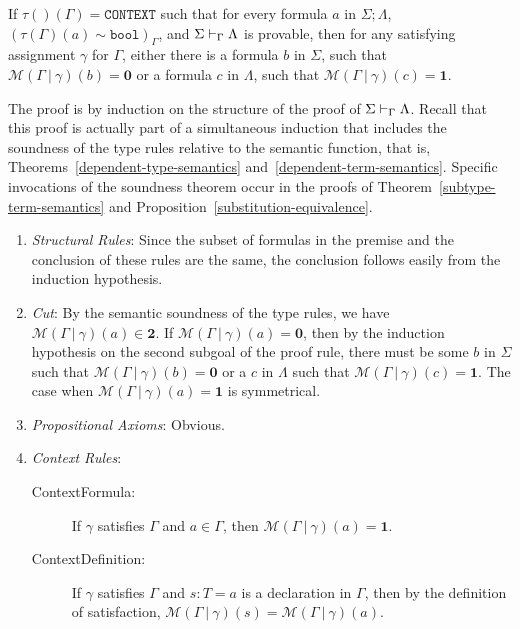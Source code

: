 \documentclass [12pt,twoside]{cslreport}
\newcommand{\thmbox}
   {{\ \hfill\hbox{%
      \vrule width1.0ex height1.0ex
   }\parfillskip 0pt }}
\newenvironment{proof}{{\bf Proof. }}{\thmbox}
\newcommand{\tauGamma}[1]{\tau(\Gamma)(#1)}
\newcommand{\Mgamma}[1]{{\mathcal M}(\Gamma\vbar\gamma)(#1)}
\newcommand{\twob}{\mathbf{2}}
\newcommand{\oneb}{\mathbf{1}}
\newcommand{\zerob}{\mathbf{0}}
\newcommand{\ttbool}{\mathtt{bool}}
\newcommand{\ttcontext}{\mathtt{CONTEXT}}
\newcommand{\vbar}{\ |\ }
\begin{document}
\begin{theorem}[soundness]\label{proof-soundness}
If $\tau()(\Gamma) = \ttcontext$ such that
for every formula $a$ in $\Sigma;  \Lambda$, $(\tauGamma{a} \sim
\ttbool)_\Gamma$,
and $\Sigma\vdash_{\Gamma}\Lambda$ is provable, then
for any satisfying assignment
$\gamma$ for $\Gamma$, 
either there is a formula $b$ in $\Sigma$, such that $\Mgamma{b} = \zerob$
or a formula $c$ in
$\Lambda$, such that $\Mgamma{c} = \oneb$\@.      
\end{theorem}
\begin{proof}
The proof is by induction on the structure of the proof of
$\Sigma\vdash_{\Gamma}\Lambda$.  Recall that this proof is actually
part of a simultaneous induction that includes the soundness of the type
rules relative to the semantic function, that is,
Theorems~\ref{dependent-type-semantics}
and~\ref{dependent-term-semantics}\@.   Specific invocations of the
soundness theorem occur in the proofs of
Theorem~\ref{subtype-term-semantics}
and Proposition~\ref{substitution-equivalence}\@.  
\begin{enumerate}
\item {\em Structural Rules\/}:   Since the subset
of formulas in the premise and the conclusion of these rules are the same,
the conclusion follows easily from the induction hypothesis.

\item {\em Cut\/}: By the semantic soundness of the type rules,
we have $\Mgamma{a} \in \twob$\@.   If $\Mgamma{a} = \zerob$, then
by the induction hypothesis on the second subgoal of the proof rule,
there must be some $b$ in $\Sigma$ such that $\Mgamma{b} = \zerob$
or a $c$ in $\Lambda$ such that $\Mgamma{c} = \oneb$\@.  The case
when $\Mgamma{a} = \oneb$ is symmetrical.

\item {\em Propositional Axioms\/}:  Obvious.

\item \emph{Context Rules}:
\begin{description}
\item[ContextFormula:]  If $\gamma$ satisfies $\Gamma$ and $a\in \Gamma$,
then $\Mgamma{a} = \oneb$\@.

\item[ContextDefinition:] If $\gamma$ satisfies $\Gamma$ and $s: T = a$
is a declaration in $\Gamma$, then by the definition of satisfaction,
$\Mgamma{s} = \Mgamma{a}$\@.


\end{description}
\end{enumerate}
\end{proof}
\end{document}
